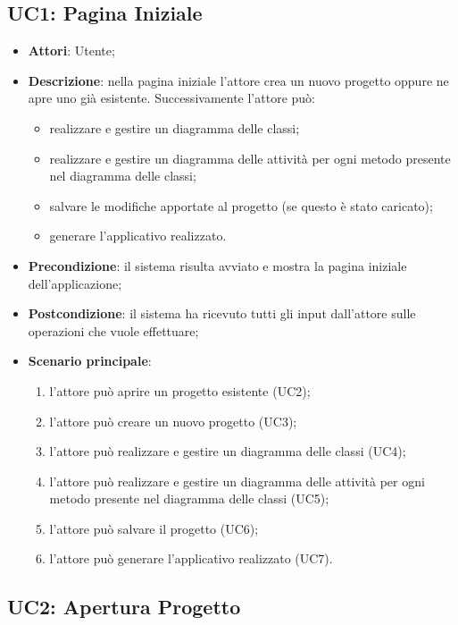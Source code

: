 \subsection{UC1: Pagina Iniziale}
\label{UC1}
\begin{itemize}
\item \textbf{Attori}: Utente;
\item \textbf{Descrizione}: nella pagina iniziale l'attore crea un nuovo progetto oppure ne apre uno già esistente.
Successivamente l'attore può:
	\begin{itemize}
	\item realizzare e gestire un diagramma delle classi;
	\item realizzare e gestire un diagramma delle attività per ogni metodo presente nel diagramma delle classi;
	\item salvare le modifiche apportate al progetto (se questo è stato caricato);
	\item generare l'applicativo realizzato.
	\end{itemize}
\item \textbf{Precondizione}: il sistema risulta avviato e mostra la pagina iniziale dell'applicazione;
\item \textbf{Postcondizione}: il sistema ha ricevuto tutti gli input dall'attore sulle operazioni che vuole effettuare;
\item \textbf{Scenario principale}:
	\begin{enumerate}
	\item l'attore può aprire un progetto esistente (UC2);
	\item l'attore può creare un nuovo progetto (UC3);
	\item l'attore può realizzare e gestire un diagramma delle classi (UC4);
	\item l'attore può realizzare e gestire un diagramma delle attività per ogni metodo presente nel diagramma delle classi (UC5);
	\item l'attore può salvare il progetto (UC6);
	\item l'attore può generare l'applicativo realizzato (UC7).
	\end{enumerate}

\end{itemize}

\subsection{UC2: Apertura Progetto}
\label{UC2}

